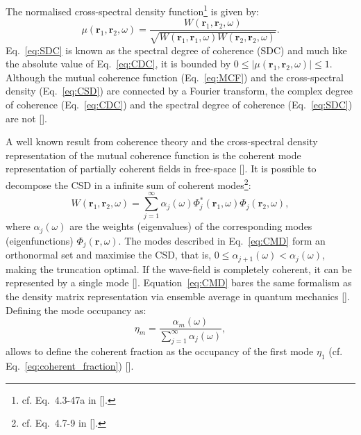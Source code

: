 \begin{refsection}
\begin{equation}
\end{equation}{}
The normalised cross-spectral density function\footnote{cf. Eq.~4.3-47a in [\cite{Mandel1995}].} is given by:
\begin{equation}\label{eq:SDC}
    \mu(\textbf{r}_1,\textbf{r}_2,\omega)=\frac{W(\textbf{r}_1,\textbf{r}_2,\omega)}{\sqrt{W(\textbf{r}_1,\textbf{r}_1,\omega)W(\textbf{r}_2,\textbf{r}_2,\omega)}}.
\end{equation}{}
Eq.~\ref{eq:SDC} is known as the spectral degree of coherence (SDC) and much like the absolute value of Eq.~\ref{eq:CDC}, it is bounded by $0\leq|\mu(\textbf{r}_1,\textbf{r}_2,\omega)|\leq 1$. Although the mutual coherence function (Eq.~\ref{eq:MCF}) and the cross-spectral density (Eq.~\ref{eq:CSD}) are connected by a Fourier transform, the complex degree of coherence (Eq.~\ref{eq:CDC}) and the spectral degree of coherence (Eq.~\ref{eq:SDC}) are not [\cite[\textit{§4.3.2}]{Mandel1995}].

A well known result from coherence theory and the cross-spectral density representation of the mutual coherence function is the coherent mode representation of partially coherent fields in free-space [\cite[\textit{§4.7.1}]{Mandel1995}]. It is possible to decompose the CSD in a infinite sum of coherent modes\footnote{cf. Eq.~4.7-9 in [\cite{Mandel1995}].}:
\begin{equation}\label{eq:CMD}
    W(\textbf{r}_1,\textbf{r}_2,\omega)=\sum\limits_{j=1}^\infty{\alpha_j(\omega)\Phi^*_j(\textbf{r}_1,\omega)\Phi_j(\textbf{r}_2,\omega)},
\end{equation}{}
where $\alpha_j(\omega)$ are the weights (eigenvalues) of the corresponding modes (eigenfunctions) $\Phi_j(\textbf{r},\omega)$. The modes described in Eq.~\ref{eq:CMD} form an orthonormal set and maximise the CSD, that is, $0\leq \alpha_{j+1}(\omega)<\alpha_j(\omega)$, making the truncation optimal. If the wave-field is completely coherent, it can be represented by a single mode [\cite[\textit{§4.7}]{Mandel1995}]. Equation~\ref{eq:CMD} bares the same formalism as the density matrix representation via ensemble average in quantum mechanics [\cite{Bazarov2012}]. Defining the mode occupancy as:
\begin{equation}\label{eq:mode_ocupation}
    \eta_m=\frac{\alpha_m(\omega)}{\sum\limits_{j=1}^\infty{\alpha_j(\omega)}},
\end{equation}{}
allows to define the coherent fraction as the occupancy of the first mode $\eta_1$ (cf. Eq.~\ref{eq:coherent_fraction}) [\cite{Glass_2017}].


\end{refsection}
